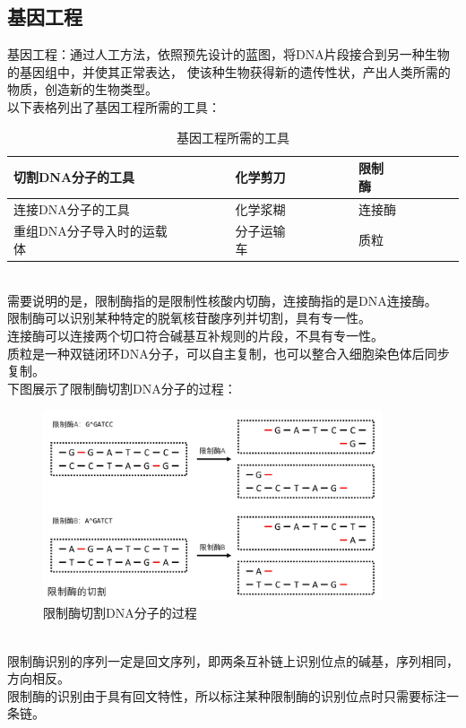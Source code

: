 \documentclass[UTF8]{ctexart}
\begin{document}
\subsection{基因工程}
    基因工程：通过人工方法，依照预先设计的蓝图，将DNA片段接合到另一种生物的基因组中，并使其正常表达，
    使该种生物获得新的遗传性状，产出人类所需的物质，创造新的生物类型。\\[3mm]
    以下表格列出了基因工程所需的工具：\vspace{5pt}
    \begin{table}[h]
        \begin{center}
            \begin{tabular}{l|l|l}
                \hline
                切割DNA分子的工具~~~~~~~~&化学剪刀~~~~~~~~&限制酶~~~~~~~~\\ \hline
                连接DNA分子的工具~~~~~~~~&化学浆糊~~~~~~~~&连接酶~~~~~~~~\\ \hline
                重组DNA分子导入时的运载体~~~~~~~~&分子运输车~~~~~~~~&质粒~~~~~~~~\\ \hline
            \end{tabular}
            \caption{基因工程所需的工具}
        \end{center}
    \end{table}\\
    需要说明的是，限制酶指的是限制性核酸内切酶，连接酶指的是DNA连接酶。\\[3mm]
    限制酶可以识别某种特定的脱氧核苷酸序列并切割，具有专一性。\\[3mm]
    连接酶可以连接两个切口符合碱基互补规则的片段，不具有专一性。\\[3mm]
    质粒是一种双链闭环DNA分子，可以自主复制，也可以整合入细胞染色体后同步复制。\\[5mm]
    下图展示了限制酶切割DNA分子的过程：
    \begin{figure}[h]
        \begin{center}
            \includegraphics[width=10cm]{BiologyImage/63.jpg}
        \end{center}
        \caption{限制酶切割DNA分子的过程}
    \end{figure}\\
    限制酶识别的序列一定是回文序列，即两条互补链上识别位点的碱基，序列相同，方向相反。\\[3mm]
    限制酶的识别由于具有回文特性，所以标注某种限制酶的识别位点时只需要标注一条链。
\end{document}
